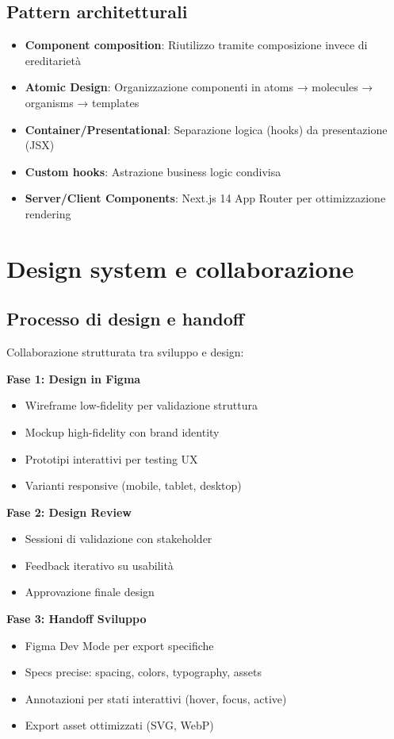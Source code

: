 \subsection{Pattern architetturali}
\begin{itemize}
  \item \textbf{Component composition}: Riutilizzo tramite composizione 
        invece di ereditarietà
  \item \textbf{Atomic Design}: Organizzazione componenti in 
        atoms → molecules → organisms → templates
  \item \textbf{Container/Presentational}: Separazione logica (hooks) 
        da presentazione (JSX)
  \item \textbf{Custom hooks}: Astrazione business logic condivisa
  \item \textbf{Server/Client Components}: Next.js 14 App Router per 
        ottimizzazione rendering
\end{itemize}

\section{Design system e collaborazione}
\subsection{Processo di design e handoff}
Collaborazione strutturata tra sviluppo e design:

\textbf{Fase 1: Design in Figma}
\begin{itemize}
  \item Wireframe low-fidelity per validazione struttura
  \item Mockup high-fidelity con brand identity
  \item Prototipi interattivi per testing UX
  \item Varianti responsive (mobile, tablet, desktop)
\end{itemize}

\textbf{Fase 2: Design Review}
\begin{itemize}
  \item Sessioni di validazione con stakeholder
  \item Feedback iterativo su usabilità
  \item Approvazione finale design
\end{itemize}

\textbf{Fase 3: Handoff Sviluppo}
\begin{itemize}
  \item Figma Dev Mode per export specifiche
  \item Specs precise: spacing, colors, typography, assets
  \item Annotazioni per stati interattivi (hover, focus, active)
  \item Export asset ottimizzati (SVG, WebP)
\end{itemize}

